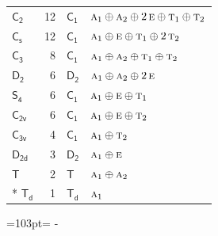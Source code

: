 \documentclass[10pt,a4paper]{article}
\newcommand{\needspace}[1]{\par\penalty-100\begingroup\dimen0=#1\relax\dimen2=\pagegoal
  \advance\dimen2-\pagetotal\ifdim\dimen0>\dimen2\relax\ifdim\dimen2>0pt\vfil\break\fi\fi
  \endgroup}
\numberwithin{equation}{section}
\newcommand{\grp}[1]{\mathsf{#1}}
\newcommand{\irr}[1]{\text{\normalfont\scshape #1}}
\newlength{\fillwidth}\newlength{\cellwidth}\newlength{\colwidth}
\begin{document}
{\begin{longtable}{@{}lrl>{\RaggedRight\arraybackslash}p{\fillwidth}@{}}
\href{C2.pdf}{$\grp{C_{2}}$} & 12 & \href{C1.pdf}{$\grp{C_{1}}$} & $\irr{a}_{1}\oplus \irr{a}_{2}\oplus 2\,\irr{e}\oplus \irr{t}_{1}\oplus \irr{t}_{2}$\\
\href{C1v.pdf}{$\grp{C_{s}}$} & 12 & \href{C1.pdf}{$\grp{C_{1}}$} & $\irr{a}_{1}\oplus \irr{e}\oplus \irr{t}_{1}\oplus 2\,\irr{t}_{2}$\\
\href{C3.pdf}{$\grp{C_{3}}$} & 8 & \href{C1.pdf}{$\grp{C_{1}}$} & $\irr{a}_{1}\oplus \irr{a}_{2}\oplus \irr{t}_{1}\oplus \irr{t}_{2}$\\
\href{D2.pdf}{$\grp{D_{2}}$} & 6 & \href{D2.pdf}{$\grp{D_{2}}$} & $\irr{a}_{1}\oplus \irr{a}_{2}\oplus 2\,\irr{e}$\\
\href{S4.pdf}{$\grp{S_{4}}$} & 6 & \href{C1.pdf}{$\grp{C_{1}}$} & $\irr{a}_{1}\oplus \irr{e}\oplus \irr{t}_{1}$\\
\href{C2v.pdf}{$\grp{C_{2v}}$} & 6 & \href{C1.pdf}{$\grp{C_{1}}$} & $\irr{a}_{1}\oplus \irr{e}\oplus \irr{t}_{2}$\\
\href{C3v.pdf}{$\grp{C_{3v}}$} & 4 & \href{C1.pdf}{$\grp{C_{1}}$} & $\irr{a}_{1}\oplus \irr{t}_{2}$\\
\href{D2d.pdf}{$\grp{D_{2d}}$} & 3 & \href{D2.pdf}{$\grp{D_{2}}$} & $\irr{a}_{1}\oplus \irr{e}$\\
\href{T.pdf}{$\grp{T}$} & 2 & \href{T.pdf}{$\grp{T}$} & $\irr{a}_{1}\oplus \irr{a}_{2}$\\*
\href{Td.pdf}{$\grp{T_{d}}$} & 1 & \href{Td.pdf}{$\grp{T_{d}}$} & $\irr{a}_{1}$\\
\bottomrule\end{longtable}}
\needspace{103pt}
\end{document}
